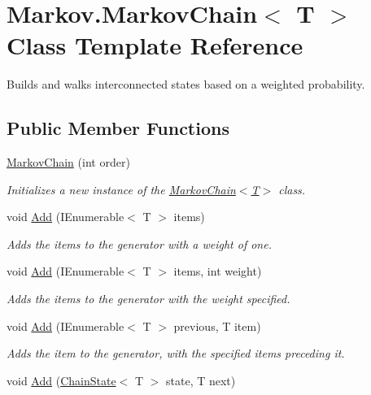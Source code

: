\hypertarget{class_markov_1_1_markov_chain}{}\section{Markov.\+Markov\+Chain$<$ T $>$ Class Template Reference}
\label{class_markov_1_1_markov_chain}


Builds and walks interconnected states based on a weighted probability.  


\subsection*{Public Member Functions}
\begin{DoxyCompactItemize}
\item 
\mbox{\hyperlink{class_markov_1_1_markov_chain_a9cb6d5ce158a936323be57ae55622086}{Markov\+Chain}} (int order)
\begin{DoxyCompactList}\small\item\em Initializes a new instance of the \mbox{\hyperlink{class_markov_1_1_markov_chain_a9cb6d5ce158a936323be57ae55622086}{Markov\+Chain$<$\+T$>$}} class. \end{DoxyCompactList}\item 
void \mbox{\hyperlink{class_markov_1_1_markov_chain_abbdb660ed58d7eed8266dabba4bc29a4}{Add}} (I\+Enumerable$<$ T $>$ items)
\begin{DoxyCompactList}\small\item\em Adds the items to the generator with a weight of one. \end{DoxyCompactList}\item 
void \mbox{\hyperlink{class_markov_1_1_markov_chain_a4c3ca6b8cea20daf5c86cb1f5996c08b}{Add}} (I\+Enumerable$<$ T $>$ items, int weight)
\begin{DoxyCompactList}\small\item\em Adds the items to the generator with the weight specified. \end{DoxyCompactList}\item 
void \mbox{\hyperlink{class_markov_1_1_markov_chain_a3de9dba327e1da281f2fb8b5b267b4bc}{Add}} (I\+Enumerable$<$ T $>$ previous, T item)
\begin{DoxyCompactList}\small\item\em Adds the item to the generator, with the specified items preceding it. \end{DoxyCompactList}\item 
void \mbox{\hyperlink{class_markov_1_1_markov_chain_a70cf0423ef0109be16558b0765ec834d}{Add}} (\mbox{\hyperlink{class_markov_1_1_chain_state}{Chain\+State}}$<$ T $>$ state, T next)

\end{DoxyCompactItemize}
